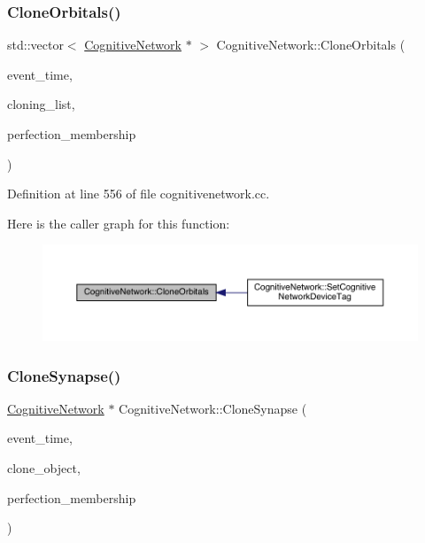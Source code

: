 \subsubsection{\texorpdfstring{Clone\+Orbitals()}{CloneOrbitals()}}
{\footnotesize\ttfamily std\+::vector$<$ \hyperlink{class_cognitive_network}{Cognitive\+Network} $\ast$ $>$ Cognitive\+Network\+::\+Clone\+Orbitals (\begin{DoxyParamCaption}\item[{std\+::chrono\+::time\+\_\+point$<$ \hyperlink{universe_8h_a0ef8d951d1ca5ab3cfaf7ab4c7a6fd80}{Clock} $>$}]{event\+\_\+time,  }\item[{std\+::vector$<$ \hyperlink{class_cognitive_network}{Cognitive\+Network} $\ast$$>$}]{cloning\+\_\+list,  }\item[{double}]{perfection\+\_\+membership }\end{DoxyParamCaption})}



Definition at line 556 of file cognitivenetwork.\+cc.

Here is the caller graph for this function\+:
\nopagebreak
\begin{figure}[H]
\begin{center}
\leavevmode
\includegraphics[width=350pt]{class_cognitive_network_a266b7baf2fd9d6b5c5652e251830020a_icgraph}
\end{center}
\end{figure}
\mbox{\label{class_cognitive_network_a40f88d3ce9d386ee4db5c1e0ad84dad2}} 
\subsubsection{\texorpdfstring{Clone\+Synapse()}{CloneSynapse()}}
{\footnotesize\ttfamily \hyperlink{class_cognitive_network}{Cognitive\+Network} $\ast$ Cognitive\+Network\+::\+Clone\+Synapse (\begin{DoxyParamCaption}\item[{std\+::chrono\+::time\+\_\+point$<$ \hyperlink{universe_8h_a0ef8d951d1ca5ab3cfaf7ab4c7a6fd80}{Clock} $>$}]{event\+\_\+time,  }\item[{\hyperlink{class_cognitive_network}{Cognitive\+Network} $\ast$}]{clone\+\_\+object,  }\item[{double}]{perfection\+\_\+membership }\end{DoxyParamCaption})}



